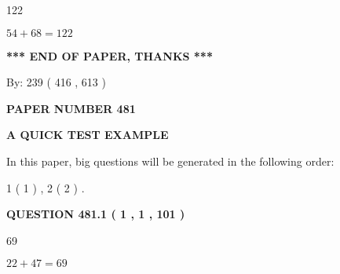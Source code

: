 \documentclass[12pt]{article}
\begin{document}
122
 
 
 
 
\noindent{}

$ %
54 +  %
68=   %
122$
 
 
   
   
 \vspace{0.2in}
 
   
   
   
   
\vspace{1.0in} 
{\textbf{\large{ *** END OF PAPER, THANKS *** }}} 
   
   
\hspace{1.0in} By: 
 239 ( 416 ,  613 )
   
   
   
   
\newpage 
\setcounter{page}{ 
   481001 } 
   
   
   
   
 {\textbf{ \Large{ PAPER NUMBER  481  }}}
   
   
\vspace{0.2in}
   
   
   
   
   
   
 \vspace{0.2in}
{\LARGE {\textbf{ A QUICK TEST EXAMPLE}}}
   
   
   
\vspace{0.2in}
   
In this paper, big questions will be generated in the following order: 
   
   
   1 ( 1 )
 ,
   2 ( 2 )
 .
  
\vspace{0.2in}
  
{\textbf{\Large{QUESTION
481.1 
 ( 1 , 1 , 101 )
}}}
  
  
 
 
\noindent{}

69
 
 
 
 
\noindent{}

$ %
22 +  %
47=   %
69$
 
\end{document}
